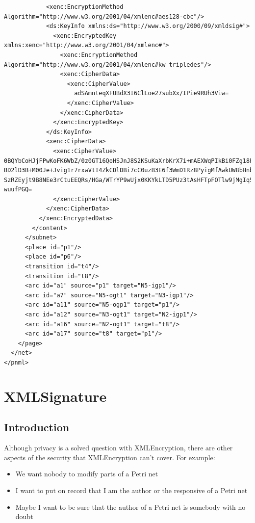 \begin{lstlisting}
            <xenc:EncryptionMethod Algorithm="http://www.w3.org/2001/04/xmlenc#aes128-cbc"/>
            <ds:KeyInfo xmlns:ds="http://www.w3.org/2000/09/xmldsig#">
              <xenc:EncryptedKey xmlns:xenc="http://www.w3.org/2001/04/xmlenc#">
                <xenc:EncryptionMethod Algorithm="http://www.w3.org/2001/04/xmlenc#kw-tripledes"/>
                <xenc:CipherData>
                  <xenc:CipherValue>
                    adSAmnteqXFUBdX3I6ClLoe27subXx/IPie9RUh3Viw=
                  </xenc:CipherValue>
                </xenc:CipherData>
              </xenc:EncryptedKey>
            </ds:KeyInfo>
            <xenc:CipherData>
              <xenc:CipherValue>
0BQYbCoHJjFPwKoFK6WbZ/0z0GT16QoHSJnJ8S2KSuKaXrbKrX7i+mAEXWqPIkBi0FZg18FwHlba
BD2lD3B+M00Je+Jvig1r7rxwVtI4ZkCDlDBi7cC0uzB3E6f3WmD1Rz8PyigMfAwkUW8bHnblqU+R
SzRZEyjt9B8NEe3rCtuEEQRs/HGa/WTrYP9wUjx0KKYkLTD5PUz3tAsHFTpFOTlw9jMgIq5QC9eP
wuufPGQ=
              </xenc:CipherValue>
            </xenc:CipherData>
          </xenc:EncryptedData>
        </content>
      </subnet>
      <place id="p1"/>
      <place id="p6"/>
      <transition id="t4"/>
      <transition id="t8"/>
      <arc id="a1" source="p1" target="N5-igp1"/>
      <arc id="a7" source="N5-ogt1" target="N3-igp1"/>
      <arc id="a11" source="N5-ogp1" target="p1"/>
      <arc id="a12" source="N3-ogt1" target="N2-igp1"/>
      <arc id="a16" source="N2-ogt1" target="t8"/>
      <arc id="a17" source="t8" target="p1"/>
    </page>
  </net>
</pnml>
\end{lstlisting}


\section{XMLSignature}

\subsection{Introduction}
Although privacy is a solved question with XMLEncryption, there are other aspects of the security that XMLEncryption can't cover. For example:

\begin{itemize}
\item We want nobody to modify parts of a Petri net
\item I want to put on record that I am the author or the responsive of a
Petri net
\item Maybe I want to be sure that the author of a Petri net is somebody
with no doubt
\end{itemize}

